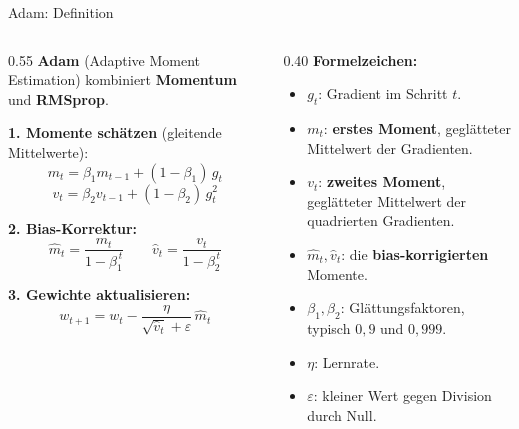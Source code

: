 \begin{frame}{Adam: Definition}
\footnotesize
\begin{columns}
\begin{column}{0.55\textwidth}
\textbf{Adam} (Adaptive Moment Estimation) kombiniert \textbf{Momentum} und \textbf{RMSprop}.

\vspace{0.3em}
\textbf{1. Momente schätzen} (gleitende Mittelwerte):
\[
m_t = \beta_1 m_{t-1} + (1-\beta_1)\, g_t
\]
\[
v_t = \beta_2 v_{t-1} + (1-\beta_2)\, g_t^2
\]

\textbf{2. Bias-Korrektur:}
\[
\hat{m}_t = \frac{m_t}{1-\beta_1^{\,t}}
\qquad
\hat{v}_t = \frac{v_t}{1-\beta_2^{\,t}}
\]

\textbf{3. Gewichte aktualisieren:}
\[
w_{t+1} = w_t - \frac{\eta}{\sqrt{\hat{v}_t} + \varepsilon}\, \hat{m}_t
\]
\end{column}
\begin{column}{0.40\textwidth}
\textbf{Formelzeichen:}
\begin{itemize}
\item $g_t$: Gradient im Schritt $t$.
\item $m_t$: \textbf{erstes Moment}, geglätteter Mittelwert der Gradienten.
\item $v_t$: \textbf{zweites Moment}, geglätteter Mittelwert der quadrierten Gradienten.
\item $\hat{m}_t, \hat{v}_t$: die \textbf{bias-korrigierten} Momente.
\item $\beta_1, \beta_2$: Glättungsfaktoren, typisch $0{,}9$ und $0{,}999$.
\item $\eta$: Lernrate.
\item $\varepsilon$: kleiner Wert gegen Division durch Null.
\end{itemize}
\end{column}
\end{columns}
\end{frame}

